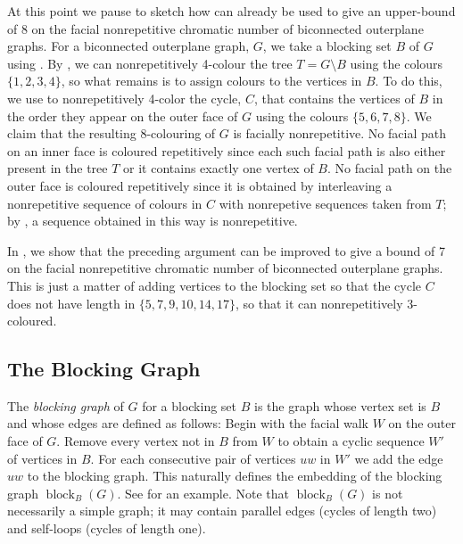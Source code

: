 \documentclass{patmorin}
\DeclareMathOperator{\block}{block}
\begin{document}
At this point we pause to sketch how 
can already be used to give an upper-bound of 8 on the facial
nonrepetitive chromatic number of biconnected outerplane graphs.  For a
biconnected outerplane graph, $G$, we take a blocking set $B$ of $G$
using .  By , we can nonrepetitively
4-colour the tree $T=G\setminus B$ using the colours $\{1,2,3,4\}$, so
what remains is to assign colours to the vertices in $B$.  To do this,
we use  to nonrepetitively 4-color the cycle, $C$, that
contains the vertices of $B$ in the order they appear on the outer face
of $G$ using the colours $\{5,6,7,8\}$.  We claim that the resulting
8-colouring of $G$ is facially nonrepetitive.  No facial path on an
inner face is coloured repetitively since each such facial path is also
either present in the tree $T$ or it contains exactly one vertex of $B$.
No facial path on the outer face is coloured repetitively since it is
obtained by interleaving a nonrepetitive sequence of colours in $C$
with nonrepetive sequences taken from $T$; by ,
a sequence obtained in this way is nonrepetitive.

In , we show that the preceding argument can be
improved to give a bound of 7 on the facial nonrepetitive chromatic
number of biconnected outerplane graphs. This is just a matter of adding
vertices to the blocking set so that the cycle $C$ does not have length
in $\{5,7,9,10,14,17\}$, so that it can nonrepetitively 3-coloured.

\subsection{The Blocking Graph}


The \emph{blocking graph} of $G$ for a blocking set $B$ is the graph
whose vertex set is $B$ and whose edges are defined as follows:  Begin
with the facial walk $W$ on the outer face of $G$. Remove every vertex
 not in $B$ from $W$ to obtain a cyclic sequence $W'$ of vertices in
$B$. For each consecutive pair of vertices $uw$ in $W'$ we add the edge
 $uw$ to the blocking graph.  This naturally defines the embedding of
 the blocking graph $\block_B(G)$. See 
 for an example.   Note that $\block_B(G)$ is not necessarily a simple
graph; it may contain parallel edges (cycles of length two) and self-loops
(cycles of length one). 
\end{document}
